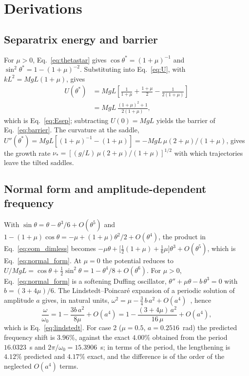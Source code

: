 \section{Derivations}\label{app:derivations}

\subsection{Separatrix energy and barrier}

For $\mu>0$, Eq.~\eqref{eq:thetastar} gives $\cos\theta^{*}=(1+\mu)^{-1}$ and $\sin^{2}\theta^{*}=1-(1+\mu)^{-2}$. Substituting into Eq.~\eqref{eq:U}, with $kL^{2}=MgL(1+\mu)$, gives
\begin{equation}
\begin{split}
U(\theta^{*}) &= MgL\left[\frac{1}{1+\mu}+\frac{1+\mu}{2}-\frac{1}{2(1+\mu)}\right]\\
&= MgL\,\frac{(1+\mu)^{2}+1}{2(1+\mu)},
\end{split}
\end{equation}
which is Eq.~\eqref{eq:Esep}; subtracting $U(0)=MgL$ yields the barrier of Eq.~\eqref{eq:barrier}. The curvature at the saddle, $U''(\theta^{*})=MgL[(1+\mu)^{-1}-(1+\mu)]=-MgL\,\mu(2+\mu)/(1+\mu)$, gives the growth rate $\nu_*=[(g/L)\,\mu(2+\mu)/(1+\mu)]^{1/2}$ with which trajectories leave the tilted saddles.

\subsection{Normal form and amplitude-dependent frequency}

With $\sin\theta=\theta-\theta^{3}/6+O(\theta^{5})$ and $1-(1+\mu)\cos\theta=-\mu+(1+\mu)\theta^{2}/2+O(\theta^{4})$, the product in Eq.~\eqref{eq:eom_dimless} becomes $-\mu\theta+\bigl[\tfrac12(1+\mu)+\tfrac16\mu\bigr]\theta^{3}+O(\theta^{5})$, which is Eq.~\eqref{eq:normal_form}. At $\mu=0$ the potential reduces to $U/MgL=\cos\theta+\tfrac12\sin^{2}\theta=1-\theta^{4}/8+O(\theta^{6})$. For $\mu>0$, Eq.~\eqref{eq:normal_form} is a softening Duffing oscillator, $\theta''+\mu\theta-b\,\theta^{3}=0$ with $b=(3+4\mu)/6$. The Lindstedt--Poincar\'e expansion of a periodic solution of amplitude $a$ gives, in natural units, $\omega^{2}=\mu-\tfrac34\,b\,a^{2}+O(a^{4})$~\cite{Strogatz2015}, hence
\begin{equation}
\frac{\omega}{\omega_0} = 1-\frac{3b\,a^{2}}{8\mu}+O(a^{4}) = 1-\frac{(3+4\mu)\,a^{2}}{16\,\mu}+O(a^{4}),
\end{equation}
which is Eq.~\eqref{eq:lindstedt}. For case 2 ($\mu=0.5$, $a=0.2516$~rad) the predicted frequency shift is $3.96\%$, against the exact $4.00\%$ obtained from the period $16.0323$~s and $2\pi/\omega_0=15.3906$~s; in terms of the period, the lengthening is $4.12\%$ predicted and $4.17\%$ exact, and the difference is of the order of the neglected $O(a^{4})$ terms.

